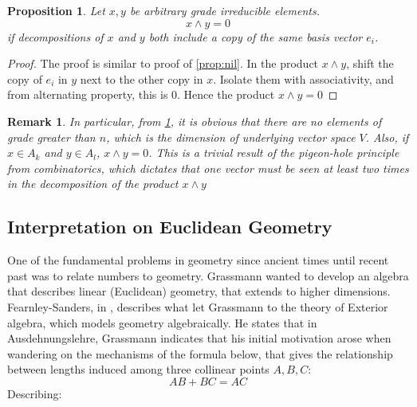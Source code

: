\documentclass[12pt]{article}
\newtheorem{proposition}[theorem]{Proposition}
\newtheorem{remark}[theorem]{Remark}
\numberwithin{theorem}{section}
\numberwithin{equation}{theorem}
\begin{document}
\begin{proposition}\label{prop:multinil}
    Let $x, y$ be arbitrary grade irreducible elements. $$x \wedge y = 0$$ if decompositions of $x$ and $y$ both include a copy of the same basis vector $e_i$.
\end{proposition}
\begin{proof}
    The proof is similar to proof of \ref{prop:nil}. In the product $x \wedge y$, shift the copy of $e_i$ in $y$ next to the other copy in $x$. Isolate them with associativity, and from alternating property, this is 0. Hence the product $x \wedge y = 0$
\end{proof}
\begin{remark}
    In particular, from \ref{prop:multinil}, it is obvious that there are no elements of grade greater than $n$, which is the dimension of underlying vector space $V$. Also, if $x \in A_k$ and $y \in A_l$, $x \wedge y = 0$. This is a trivial result of the pigeon-hole principle from combinatorics, which dictates that one vector must be seen at least two times in the decomposition of the product $x \wedge y$
\end{remark}

\subsection{Interpretation on Euclidean Geometry}
One of the fundamental problems in geometry since ancient times until recent past was to relate numbers to geometry. Grassmann wanted to develop an algebra that describes linear (Euclidean) geometry, that extends to higher dimensions. Fearnley-Sanders, in \cite{desmond}, describes what let Grassmann to the theory of Exterior algebra, which models geometry algebraically. He states that in Ausdehnungslehre, Grassmann indicates that his initial motivation arose when wandering on the mechanisms of the formula below, that gives the relationship between lengths induced among three collinear points $A, B, C$:
$$AB + BC = AC$$
Describing:\\
\begin{minipage}{\textwidth}
\centering
{}
\end{minipage}
\end{document}
